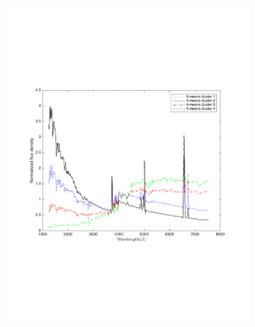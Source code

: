 \begin{figure}
                \begin{subfigure}[b]{0.49\textwidth}
                    \centering
                  \includegraphics[width=.99\textwidth]{k_means_images/classified_group_in_4cluster_142.pdf}
                \end{subfigure}
                \hfill
                \begin{subfigure}[b]{0.49\textwidth}

\end{subfigure}
\end{figure}
